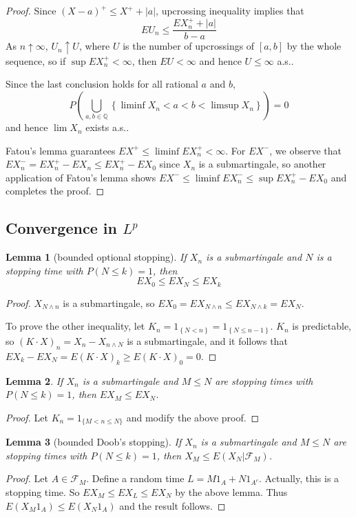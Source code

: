 \documentclass{article}
\newtheorem{Lem}{Lemma}[section]
\theoremstyle{definition}
\begin{document}
\begin{proof}
Since $(X-a)^+\le X^++\left|a\right|$, upcrossing inequality implies that \[EU_n\le \frac{ EX^+_n+\left|a\right|}{b-a}\]
As $n\uparrow\infty$, $U_n\uparrow U$, where $U$ is the number of upcrossings of $[a,b]$ by the whole sequence, so if $\sup EX_n^+<\infty$, then $EU<\infty$ and hence $U\le\infty$ a.s..\par
Since the last conclusion holds for all rational $a$ and $b$,\[P(\bigcup_{a,b\in\mathbb{Q}}\left\{\liminf X_n<a<b<\limsup X_n\right\})=0\]
and hence $\lim X_n$ exists a.s..\par
Fatou's lemma guarantees $EX^+\le\liminf EX_n^+<\infty$. For $EX^-$, we observe that $EX_n^-=EX_n^+-EX_n\le EX_n^+-EX_0$ since $X_n$ is a submartingale, so another application of Fatou's lemma shows $EX^-\le\liminf EX^-_n\le \sup EX_n^+-EX_0$ and completes the proof.
\end{proof}
\subsection{Convergence in $L^p$}
\begin{Lem}[bounded optional stopping]\label{Bounded Optional Stopping}
If $X_n$ is a submartingale and $N$ is a stopping time with $P(N\le k)=1$, then \[EX_0\le EX_N\le EX_k\]
\end{Lem}
\begin{proof}
$X_{N\wedge n}$ is a submartingale, so $EX_0=EX_{N\wedge n}\le EX_{N\wedge k}=EX_N$.\par
To prove the other inequality, let $K_n=1_{\left\{N<n\right\}}=1_{\left\{N\le n-1\right\}}$. $K_n$ is predictable, so $(K\cdot X)_n=X_n-X_{n\wedge N}$ is a submartingale, and it follows that $EX_k-EX_N=E(K\cdot X)_k\ge E(K\cdot X)_0=0$.
\end{proof}
\begin{Lem}
    If $X_n$ is a submartingale and $M\le N$ are stopping times with $P(N\le k)=1$,
    then $EX_M\le EX_N$.
\end{Lem}
\begin{proof}
    Let $K_n=1_{\{M<n\le N\}}$ and modify the above proof.
\end{proof}
\begin{Lem}[bounded Doob's stopping]
    If $X_n$ is a submartingale and $M\le N$ are stopping times with $P(N\le k)=1$,
    then $X_M\le E(X_N|\mathcal{F}_M)$.
\end{Lem}
\begin{proof}
    Let $A\in\mathcal{F}_M$. Define a random time $L=M 1_A +N 1_{A^c}$. Actually, this is a stopping time.
    So $EX_M\le EX_L\le EX_N$ by the above lemma. Thus $E(X_M 1_A)\le E(X_N 1_A)$ and the result follows.
\end{proof}
\end{document}
